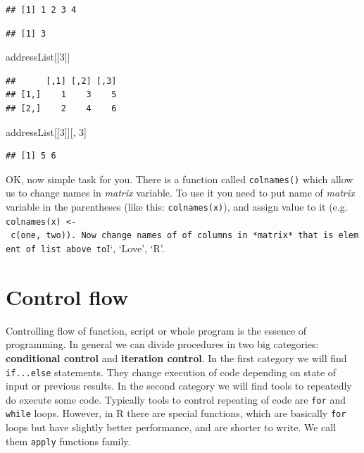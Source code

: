 \documentclass[]{book}
\newenvironment{Shaded}{\begin{snugshade}}{\end{snugshade}}
\newcommand{\DecValTok}[1]{\textcolor[rgb]{0.00,0.00,0.81}{#1}}
\newcommand{\OperatorTok}[1]{\textcolor[rgb]{0.81,0.36,0.00}{\textbf{#1}}}
\newcommand{\NormalTok}[1]{#1}
\theoremstyle{definition}
\theoremstyle{definition}
\theoremstyle{definition}
\theoremstyle{remark}
\begin{document}
\begin{verbatim}
## [1] 1 2 3 4
\end{verbatim}

\begin{Shaded}
\end{Shaded}

\begin{verbatim}
## [1] 3
\end{verbatim}

\begin{Shaded}
\begin{Highlighting}[]
\NormalTok{addressList[[}\DecValTok{3}\NormalTok{]]}
\end{Highlighting}
\end{Shaded}

\begin{verbatim}
##      [,1] [,2] [,3]
## [1,]    1    3    5
## [2,]    2    4    6
\end{verbatim}

\begin{Shaded}
\begin{Highlighting}[]
\NormalTok{addressList[[}\DecValTok{3}\NormalTok{]][, }\DecValTok{3}\NormalTok{]}
\end{Highlighting}
\end{Shaded}

\begin{verbatim}
## [1] 5 6
\end{verbatim}

OK, now simple task for you. There is a function called
\texttt{colnames()} which allow us to change names in \emph{matrix}
variable. To use it you need to put name of \emph{matrix} variable in
the parentheses (like this: \texttt{colnames(x)}), and assign value to
it (e.g.
\texttt{colnames(x)\ \textless{}-\ c(\textquotesingle{}one\textquotesingle{},\ \textquotesingle{}two\textquotesingle{})).\ Now\ change\ names\ of\ of\ columns\ in\ *matrix*\ that\ is\ element\ of\ list\ above\ to}I`,
`Love', `R'.

\section{Control flow}\label{control-flow}

Controlling flow of function, script or whole program is the essence of
programming. In general we can divide procedures in two big categories:
\textbf{conditional control} and \textbf{iteration control}. In the
first category we will find \texttt{if...else} statements. They change
execution of code depending on state of input or previous results. In
the second category we will find tools to repeatedly do execute some
code. Typically tools to control repeating of code are \texttt{for} and
\texttt{while} loops. However, in R there are special functions, which
are basically \texttt{for} loops but have slightly better performance,
and are shorter to write. We call them \texttt{apply} functions family.
\end{document}
